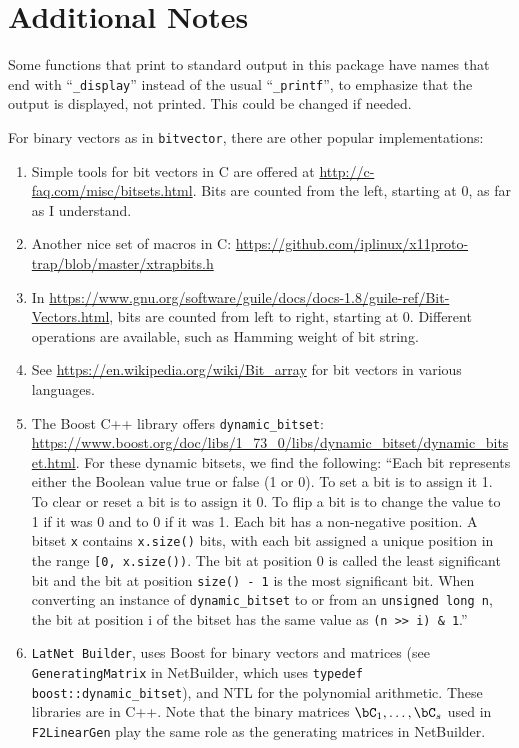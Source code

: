 \section*{Additional Notes}

Some functions that print to standard output in this package have names that end with
``\texttt{\_display}'' instead of the usual ``\texttt{\_printf}'', 
to emphasize that the output is displayed, not printed.  This could be changed if needed.

For binary vectors as in \texttt{bitvector}, there are other popular implementations:
\begin{enumerate}
\item
Simple tools for bit vectors in C are offered at \url{http://c-faq.com/misc/bitsets.html}.
Bits are counted from the left, starting at 0, as far as I understand.
\item 
Another nice set of macros in C:
\url{https://github.com/iplinux/x11proto-trap/blob/master/xtrapbits.h}
\item
In \url{https://www.gnu.org/software/guile/docs/docs-1.8/guile-ref/Bit-Vectors.html},
bits are counted from left to right, starting at 0.
Different operations are available, such as Hamming weight of bit string.
\item
See \url{https://en.wikipedia.org/wiki/Bit_array} for bit vectors in various languages.
%
\item
The Boost C++ library offers  \texttt{dynamic\_bitset}:  
\url{https://www.boost.org/doc/libs/1\_73\_0/libs/dynamic\_bitset/dynamic\_bitset.html}.
For these dynamic bitsets, we  find the following: 
{\small
``Each bit represents either the Boolean value true or false (1 or 0). To set a bit is to assign it 1. To clear or reset a bit is to assign it 0. To flip a bit is to change the value to 1 if it was 0 and to 0 if it was 1. Each bit has a non-negative position. A bitset \texttt{x} contains \texttt{x.size()} bits, with each bit assigned a unique position in the range \texttt{[0, x.size())}. The bit at position 0 is called the least significant bit and the bit at position \texttt{size() - 1} is the most significant bit. When converting an instance of \texttt{dynamic\_bitset} to or from an \texttt{unsigned long n}, the bit at position i of the bitset has the same value as \hbox{\tt (n >> i) \& 1}.''}
%
\item
\texttt{LatNet Builder}, uses Boost for binary vectors and matrices
(see \texttt{GeneratingMatrix} in NetBuilder, which uses 
\texttt{typedef boost::dynamic\_bitset}), 
and NTL for the polynomial arithmetic.  These libraries are in C++. 
Note that the binary matrices $\bC_1,\dots,\bC_s$ used in \texttt{F2LinearGen} 
play the same role as the generating matrices in NetBuilder.  
\end{enumerate}


